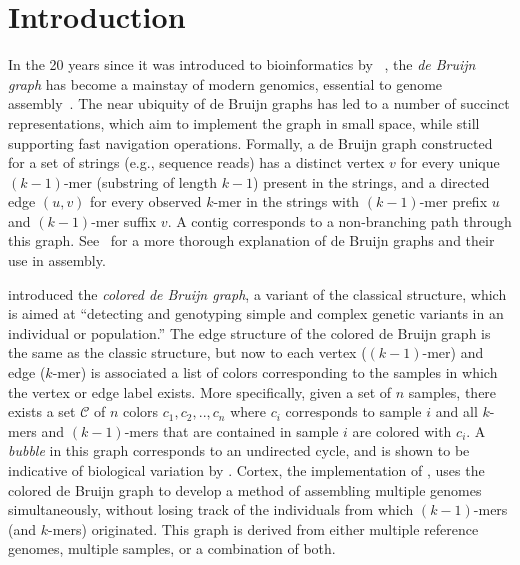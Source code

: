 
\section{Introduction}

In the 20 years since it was introduced to bioinformatics by ~\cite{IW95}, the {\em de Bruijn graph} has become a mainstay of modern genomics, essential to genome assembly~\citep{how,sequel,ismb2015}. The near ubiquity of de Bruijn graphs has led to a number of succinct representations, which aim to implement the graph in small space, while still supporting fast navigation operations.  Formally, a de Bruijn graph constructed for a set of strings (e.g., sequence reads) has a distinct vertex $v$ for every unique $(k - 1)$-mer (substring of length $k - 1$) present in the strings, and a directed edge $(u, v)$ for every observed $k$-mer in the strings with $(k - 1)$-mer prefix $u$ and $(k - 1)$-mer suffix $v$. A contig corresponds to a non-branching path through this graph. See~\citep{how} for a more thorough explanation of de Bruijn graphs and their use in assembly. 

\cite{ICTFM12} introduced the {\em colored de Bruijn graph}, a variant of the classical structure, which is aimed at ``detecting and genotyping simple and complex genetic variants in an individual or population.'' The edge structure of the colored de Bruijn graph is the same as the classic structure, but now to each vertex ($(k - 1)$-mer) and edge ($k$-mer)
is associated a list of colors corresponding to the samples in which the vertex or edge label exists. More specifically, given a set of $n$ samples, there exists a set $\mathcal{C}$ of $n$ colors $c_1, c_2, .., c_n$ where $c_i$ corresponds to sample $i$ and all $k$-mers and $(k-1)$-mers that are contained in sample $i$ are colored with $c_i$. A {\em bubble} in this graph corresponds to an undirected cycle, and is shown to be indicative of biological variation by \cite{ICTFM12}. 
{\sc Cortex}, the implementation of \cite{ICTFM12}, uses the colored de Bruijn graph to develop a method of assembling multiple genomes simultaneously, without losing track of the individuals from which $(k - 1)$-mers (and $k$-mers) originated. This graph is derived from either multiple reference genomes, multiple samples, or a combination of both.

